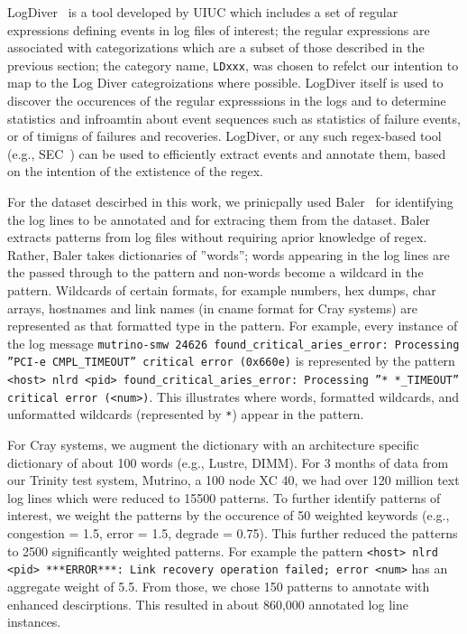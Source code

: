 LogDiver~\cite{LogDiver} is a tool developed by UIUC which includes a set of regular expressions defining
events in log files of interest; the regular expressions are associated with categorizations
which are a subset of those described in the previous section; the
category name, \texttt{LDxxx}, was chosen to refelct our intention to map to the
Log Diver categroizations where possible.
LogDiver itself is used to discover the occurences of the regular
expresssions in the logs and to determine statistics and infroamtin about event sequences
such as statistics of failure events, or of timigns of failures and recoveries.
LogDiver, or any such regex-based tool (e.g., SEC~\cite{SEC}) can be used to efficiently extract events
and annotate them, based on the intention of the extistence of the regex.

For the dataset descirbed in this work, we prinicpally used Baler~\cite{Baler} for
identifying the log lines to be annotated and for extracing them from the dataset.
Baler extracts patterns from log files without requiring aprior knowledge of
regex. Rather, Baler takes dictionaries of ''words''; words appearing in the log lines
are the passed through to the pattern and non-words become a wildcard in the pattern.
Wildcards of certain formats, for example numbers, hex dumps, char arrays, hostnames and link names
(in cname format for Cray systems) are represented as that formatted type in the pattern.
For example, every instance of the log message \texttt{mutrino-smw 24626 found\_critical\_aries\_error: Processing ''PCI-e CMPL\_TIMEOUT'' critical error (0x660e)}
is represented by the pattern \texttt{<host> nlrd <pid> found\_critical\_aries\_error: Processing ''* *\_TIMEOUT'' critical error (<num>)}.
This illustrates where words, formatted wildcards, and unformatted wildcards (represented by \texttt{*}) appear in the pattern.

For Cray systems, we augment
the dictionary with an architecture specific dictionary of about 100 words (e.g., Lustre, DIMM).
For 3 months of data from our Trinity test system, Mutrino, a 100 node XC 40,
we had over 120 million text log lines which were reduced to 15500 patterns. To further identify patterns
of interest, we weight the patterns by the occurence of 50 weighted
keywords (e.g., congestion = 1.5, error = 1.5, degrade = 0.75). This further reduced the patterns
to 2500 significantly weighted patterns. For example the pattern
\texttt{<host> nlrd <pid> ***ERROR***: Link recovery operation failed; error <num>} has
an aggregate weight of 5.5. From those, we chose 150
patterns to annotate with enhanced descirptions. This resulted in about 860,000
annotated log line instances.


